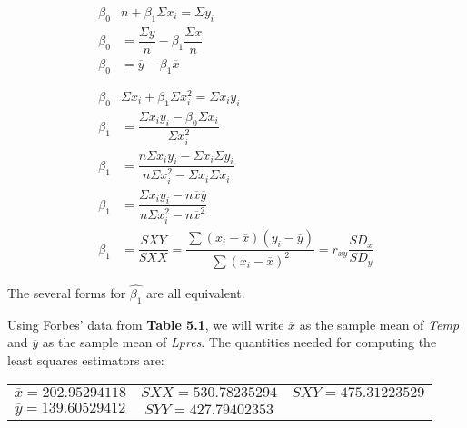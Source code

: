 \documentclass{article}
\begin{document}
    \begin{align} 
        \beta_{0} &n + \beta_{1} \Sigma x_{i} = \Sigma y_{i}                \nonumber \\
        \beta_{0} &= \dfrac {\Sigma y}{n} - \beta_{1}  \dfrac {\Sigma x}{n} \nonumber \\
        \beta_{0} &= \overline{y} - \beta_{1}  \overline{x}                 \\
        \nonumber \\
        \nonumber \\
        \beta_{0} &\Sigma x_{i} + \beta_{1} \Sigma x_{i}^2 = \Sigma x_{i} y_{i} \nonumber \\
        \beta_{1} &= \dfrac{\Sigma x_{i}y_{i} - \beta _{0} \Sigma x_{i} }{ \Sigma x_{i}^2} \nonumber \\
        \beta_{1} &= \dfrac{n \Sigma x_{i} y_{i} - \Sigma x_{i} \Sigma y_{i}}{n \Sigma x_{i}^2 - \Sigma x_{i} \Sigma x_{i}} \nonumber \\
        \beta_{1} &= \dfrac{\Sigma x_{i} y_{i} - n \overline{x} \overline{y}}{n \Sigma x_{i}^2 - n \overline{x}^2} \nonumber \\
        \beta_{1} &= \dfrac{SXY}{SXX} = \dfrac
        {\displaystyle\sum(x_{i}-\overline{x})(y_{i}-\overline{y})}
        {\displaystyle \sum {\left(x_{i} - \overline{x}\right)}^2} 
        = r_{xy} \dfrac{SD_{x}}{SD_{y}}
    \end{align}
    
    The several forms for $\hat{\beta_{1}}$ are all equivalent.
    
    
    Using Forbes’ data from \textbf{Table 5.1}, we will write $\overline{x}$ as the sample mean of \textit{Temp} and $\overline{y}$ as the sample mean of \textit{Lpres}. The quantities needed for computing the least squares estimators are: 
    
    \begin{center}
        \begin{tabular}{c c c}
            $\overline{x} = 202.95294118 $ & $SXX = 530.78235294 $ & $SXY = 475.31223529 $ \\
            $\overline{y} = 139.60529412 $ & $SYY = 427.79402353 $
        \end{tabular}
    \end{center}
    
\end{document}
